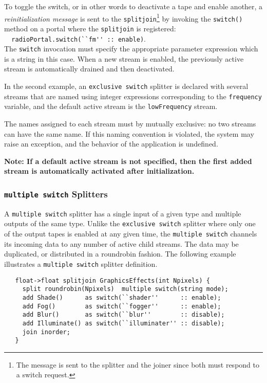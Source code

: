 \documentclass{tr}
\begin{document}
To  toggle the  switch, or  in other  words to  deactivate a  tape and
enable  another,  a {\it  reinitialization  message}  is  sent to  the
\verb+splitjoin+\footnote{The message is sent  to the splitter and the
joiner since both  must respond to a switch  request.} by invoking the
\verb+switch()+  method  on a  portal  where  the \verb+splitjoin+  is
registered:\\
\verb+  radioPortal.switch(``fm'' :: enable)+.\\
The \texttt{switch} invocation  must specify the appropriate parameter
expression  which is  a string  in this  case.  When  a new  stream is
enabled,  the previously  active stream  is automatically  drained and
then deactivated.

In  the  second  example,  an \texttt{exclusive  switch}  splitter  is
declared with several streams that are named using integer expressions
corresponding to the \verb+frequency+ variable, and the default active
stream is the  \verb+lowFrequency+ stream. 

The names assigned  to each stream must by  mutually exclusive: no two
streams can have the same name. If this naming convention is violated,
the system may raise an exception, and the behavior of the application
is undefined.

{\bf Note: If a default active stream is not specified, then the first
added stream is automatically activated after initialization.}



\subsubsection {\texttt{multiple switch} Splitters}

A \texttt{multiple switch} splitter has a single input of a given type
and multiple  outputs of the  same type. Unlike  the \texttt{exclusive
switch} splitter where only one of  the output tapes is enabled at any
given time, the \texttt{multiple switch} channels its incoming data to
any number  of active  child streams. The  data may be  duplicated, or
distributed   in  a   roundrobin  fashion.    The   following  example
illustrates a \texttt{multiple switch} splitter definition.
\begin{verbatim}
   float->float splitjoin GraphicsEffects(int Npixels) {
     split roundrobin(Npixels)  multiple switch(string mode);
     add Shade()      as switch(``shader''      :: enable);
     add Fog()        as switch(``fogger''      :: enable);
     add Blur()       as switch(``blur''        :: disable);
     add Illuminate() as switch(``illuminater'' :: disable);
     join inorder;
   }
\end{verbatim}
\end{document}
